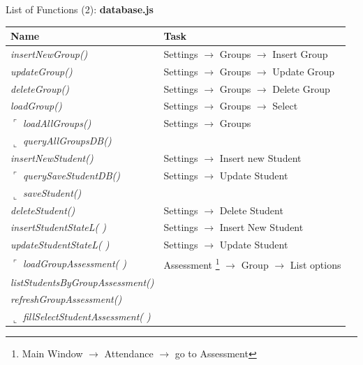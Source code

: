 \newpage


\begin{bclogo}[couleur=orange!30,logo=\bcbook, arrondi=0.1,ombre=true ] 
{List of Functions (2): {\bf database.js}}	
\begin{tabular}{ll}
Name                    & Task            \\
\hline

\emph{ insertNewGroup()}               &{ Settings $\rightarrow$ Groups  $\rightarrow$ Insert Group }   \\
\emph{ updateGroup()  }                &{ Settings $\rightarrow$ Groups  $\rightarrow$ Update Group  }\\
\emph{ deleteGroup() }                 &{  Settings $\rightarrow$ Groups  $\rightarrow$ Delete Group } \\
\emph{ loadGroup()             }        & { Settings $\rightarrow$ Groups  $\rightarrow$ Select  } \\

$\ulcorner$ \emph{ loadAllGroups()         }        & {  Settings $\rightarrow$ Groups  }  \\
$\llcorner$\emph{ queryAllGroupsDB()      }        & {}  \\
\emph{ insertNewStudent() }            & { Settings  $\rightarrow$  Insert new Student  } \\
$\ulcorner$ \emph{ querySaveStudentDB() }          &  Settings  $\rightarrow$  Update Student \\
$\llcorner$ \emph{ saveStudent() }                 & { } \\
\emph{ deleteStudent()}                & { Settings  $\rightarrow$  Delete Student } \\
\emph{ insertStudentStateL( ) }         & { Settings  $\rightarrow$  Insert New Student  }\\
\emph{ updateStudentStateL( )  }        & { Settings  $\rightarrow$   Update Student }\\

$\ulcorner$ \emph { loadGroupAssessment(  ) }       & { Assessment  \footnote{Main Window $\rightarrow$ Attendance $\rightarrow$ go to Assessment} $\rightarrow$ Group $\rightarrow$  List options  } \\
\emph { listStudentsByGroupAssessment()} & {  } \\
\emph { refreshGroupAssessment()}       & { } \\
$\llcorner$ \emph { fillSelectStudentAssessment( )}  & {  }\\


\end{tabular}
\end{bclogo}
